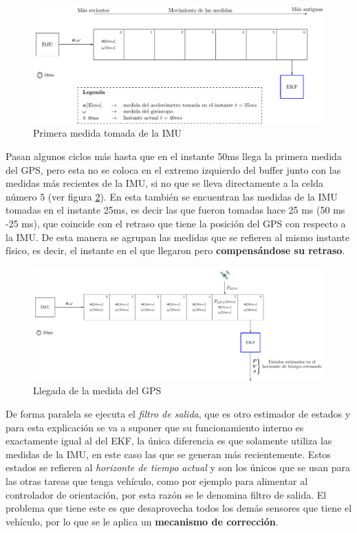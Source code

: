\begin{figure}
\includegraphics[width=\textwidth]{estimador_px4/tikz/ekf_output_1}
\caption{Primera medida tomada de la IMU}
\label{fig:est1}
\end{figure}

Pasan algunos ciclos más hasta que en el instante 50ms llega la primera medida del GPS, pero esta no se coloca en el extremo izquierdo del buffer junto con las medidas más recientes de la IMU, si no que se lleva directamente a la celda número 5 (ver figura \ref{fig:est2}). En esta también se encuentran las medidas de la IMU tomadas en el instante 25ms, es decir las que fueron tomadas hace 25 ms (50 ms -25 ms), que coincide con el retraso que tiene la posición del GPS con respecto a la IMU. De esta manera se agrupan las medidas que se refieren al mismo instante físico, es decir, el instante en el que llegaron pero {\bfseries compensándose su retraso}. 

\begin{figure}
\includegraphics[width=\textwidth]{estimador_px4/tikz/ekf_output_2}
\caption{Llegada de la medida del GPS}
\label{fig:est2}
\end{figure}

De forma paralela se ejecuta el \textit{filtro de salida}, que es otro estimador de estados y para esta explicación se va a suponer que su funcionamiento interno es exactamente igual al del EKF, la única diferencia es que solamente utiliza las medidas de la IMU, en este caso las que se generan más recientemente. Estos estados se refieren al \textit{horizonte de tiempo actual} y son los únicos que se usan para las otras tareas que tenga vehículo, como por ejemplo para alimentar al controlador de orientación, por esta razón se le denomina filtro de salida. El problema que tiene este es que desaprovecha todos los demás sensores que tiene el vehículo, por lo que se le aplica un \textbf{mecanismo de corrección}.  

